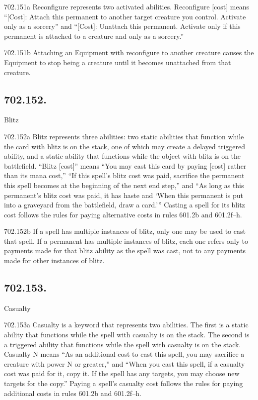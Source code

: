 702.151a Reconfigure represents two activated abilities. Reconfigure [cost] means “[Cost]: Attach this permanent to another target creature you control. Activate only as a sorcery” and “[Cost]: Unattach this permanent. Activate only if this permanent is attached to a creature and only as a sorcery.”

702.151b Attaching an Equipment with reconfigure to another creature causes the Equipment to stop being a creature until it becomes unattached from that creature.

\subsection*{702.152.}
Blitz

702.152a Blitz represents three abilities: two static abilities that function while the card with blitz is on the stack, one of which may create a delayed triggered ability, and a static ability that functions while the object with blitz is on the battlefield. “Blitz [cost]” means “You may cast this card by paying [cost] rather than its mana cost,” “If this spell’s blitz cost was paid, sacrifice the permanent this spell becomes at the beginning of the next end step,” and “As long as this permanent’s blitz cost was paid, it has haste and ‘When this permanent is put into a graveyard from the battlefield, draw a card.’” Casting a spell for its blitz cost follows the rules for paying alternative costs in rules 601.2b and 601.2f–h.

702.152b If a spell has multiple instances of blitz, only one may be used to cast that spell. If a permanent has multiple instances of blitz, each one refers only to payments made for that blitz ability as the spell was cast, not to any payments made for other instances of blitz.

\subsection*{702.153.}
Casualty

702.153a Casualty is a keyword that represents two abilities. The first is a static ability that functions while the spell with casualty is on the stack. The second is a triggered ability that functions while the spell with casualty is on the stack. Casualty N means “As an additional cost to cast this spell, you may sacrifice a creature with power N or greater,” and “When you cast this spell, if a casualty cost was paid for it, copy it. If the spell has any targets, you may choose new targets for the copy.” Paying a spell’s casualty cost follows the rules for paying additional costs in rules 601.2b and 601.2f–h.

